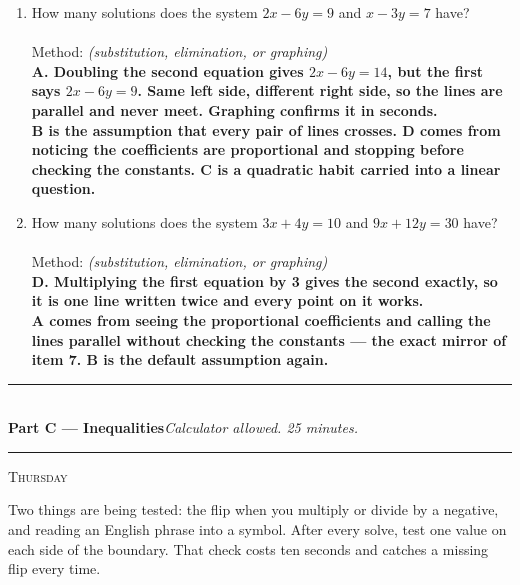 \documentclass[11pt,a4paper]{article}
\newif\ifANSWERS
\newcommand{\PartHead}[2]{%
  \vspace{6pt}
  {\color{navy}\rule{\textwidth}{0.8pt}}\\[2pt]
  {\large\bfseries\color{navy}#1}\hfill{\small\itshape #2}\\[-4pt]
  {\color{navy}\rule{\textwidth}{0.4pt}}
  \vspace{4pt}
}
\newcommand{\sitting}[1]{{\footnotesize\textsc{\color{navy}#1}}\par\vspace{2pt}}
\newcommand{\ans}[1]{\ {\color{keyred}\bfseries #1}}
\newcommand{\ans}[1]{}
\newcommand{\method}{\\[3pt]\hspace*{6pt}Method: \underline{\hspace{4.6cm}}\hfill{\footnotesize\itshape(substitution, elimination, or graphing)}}
\begin{document}
\begin{enumerate}[leftmargin=20pt,itemsep=9pt]
\item How many solutions does the system $2x-6y=9$ and $x-3y=7$ have?\\
  \method
  \ans{\\ A. Doubling the second equation gives $2x-6y=14$, but the first says $2x-6y=9$. Same left side, different right side, so the lines are parallel and never meet. Graphing confirms it in seconds. \\ B is the assumption that every pair of lines crosses. D comes from noticing the coefficients are proportional and stopping before checking the constants. C is a quadratic habit carried into a linear question.}

\item How many solutions does the system $3x+4y=10$ and $9x+12y=30$ have?\\
  \method
  \ans{\\ D. Multiplying the first equation by 3 gives the second exactly, so it is one line written twice and every point on it works. \\ A comes from seeing the proportional coefficients and calling the lines parallel without checking the constants --- the exact mirror of item 7. B is the default assumption again.}

\end{enumerate}

\ifANSWERS\else\newpage\fi
\PartHead{Part C --- Inequalities}{Calculator allowed. 25 minutes.}
\sitting{Thursday}
Two things are being tested: the flip when you multiply or divide by a negative, and
reading an English phrase into a symbol. After every solve, test one value on each
side of the boundary. That check costs ten seconds and catches a missing flip every time.
\end{document}
